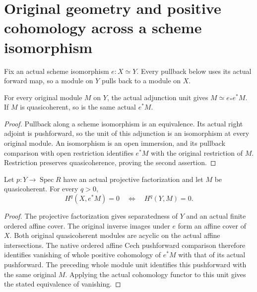 \section{Original geometry and positive cohomology across a scheme isomorphism}

Fix an actual scheme isomorphism $e:X\simeq Y$.  Every pullback below
uses its actual forward map, so a module on $Y$ pulls back to a module
on $X$.

\begin{lemma}
\label{lem:kn-scheme-iso-module-unit}
\leanok
{}
For every original module $M$ on $Y$, the actual adjunction unit gives
$M\simeq e_*e^*M$.  If $M$ is quasicoherent, so is the same actual
$e^*M$.
\end{lemma}
\begin{proof}
Pullback along a scheme isomorphism is an equivalence.  Its actual
right adjoint is pushforward, so the unit of this adjunction is an
isomorphism at every original module.  An isomorphism is an open
immersion, and its pullback comparison with open restriction identifies
$e^*M$ with the original restriction of $M$.  Restriction preserves
quasicoherence, proving the second assertion.
\end{proof}

\begin{lemma}
\label{lem:kn-scheme-iso-positive-cohomology}
\leanok
{}
Let $p:Y\to\operatorname{Spec}R$ have an actual projective
factorization and let $M$ be quasicoherent.  For every $q>0$,
\[
 H^q(X,e^*M)=0\quad\Longleftrightarrow\quad H^q(Y,M)=0.
\]
\end{lemma}
\begin{proof}
The projective factorization gives separatedness of $Y$ and an actual
finite ordered affine cover.  The original inverse images under $e$
form an affine cover of $X$.  Both original quasicoherent modules are
acyclic on the actual affine intersections.  The native ordered affine
Cech pushforward comparison therefore identifies vanishing of whole
positive cohomology of $e^*M$ with that of its actual pushforward.
The preceding whole module unit identifies this pushforward with the
same original $M$.  Applying the actual cohomology functor to this
unit gives the stated equivalence of vanishing.
\end{proof}

